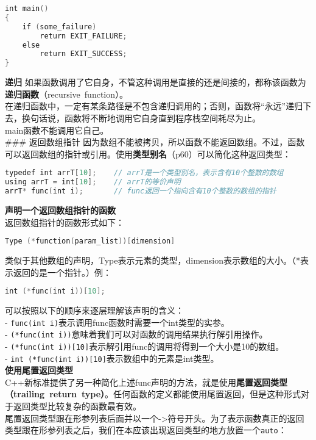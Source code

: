 \documentclass[
  a4paper,
  oneside,tablecaptionabove
]{scrbook}
\begin{document}
\begin{lstlisting}[language={C++}]
int main()
{
    if (some_failure)
        return EXIT_FAILURE;
    else
        return EXIT_SUCCESS;
}
\end{lstlisting}

\textbf{递归}
如果函数调用了它自身，不管这种调用是直接的还是间接的，都称该函数为\textbf{递归函数}（recursive~function）。\\
在递归函数中，一定有某条路径是不包含递归调用的；否则，函数将\enquote{永远}递归下去，换句话说，函数将不断地调用它自身直到程序栈空间耗尽为止。\\
main函数不能调用它自己。\\
\#\#\# 返回数组指针
因为数组不能被拷贝，所以函数不能返回数组。不过，函数可以返回数组的指针或引用。使用\textbf{类型别名}（p60）可以简化这种返回类型：

\begin{lstlisting}[language={C++}]
typedef int arrT[10];    // arrT是一个类型别名，表示含有10个整数的数组
using arrT = int[10];    // arrT的等价声明
arrT* func(int i);       // func返回一个指向含有10个整数的数组的指针
\end{lstlisting}

\textbf{声明一个返回数组指针的函数}\\
返回数组指针的函数形式如下：

\begin{lstlisting}[language={C++}]
Type (*function(param_list))[dimension]
\end{lstlisting}

类似于其他数组的声明，Type表示元素的类型，dimension表示数组的大小。（*表示返回的是一个指针。）例：

\begin{lstlisting}[language={C++}]
int (*func(int i))[10];
\end{lstlisting}

可以按照以下的顺序来逐层理解该声明的含义：\\
- \lstinline!func(int i)!表示调用func函数时需要一个int类型的实参。\\
-
\lstinline!(*func(int i))!意味着我们可以对函数的调用结果执行解引用操作。\\
-
\lstinline!(*func(int i))[10]!表示解引用func的调用将得到一个大小是10的数组。\\
- \lstinline!int (*func(int i))[10]!表示数组中的元素是int类型。\\
\textbf{使用尾置返回类型}\\
C++新标准提供了另一种简化上述func声明的方法，就是使用\textbf{尾置返回类型（trailing~return~type）}。任何函数的定义都能使用尾置返回，但是这种形式对于返回类型比较复杂的函数最有效。\\
尾置返回类型跟在形参列表后面并以一个-\textgreater{}符号开头。为了表示函数真正的返回类型跟在形参列表之后，我们在本应该出现返回类型的地方放置一个\lstinline!auto!：
\end{document}
